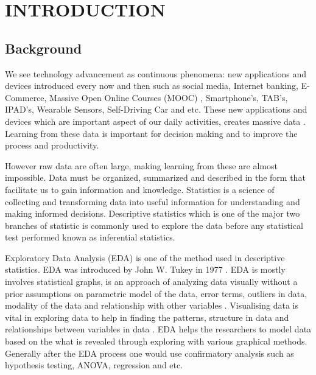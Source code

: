 \chapter{\textbf{INTRODUCTION}}\label{Introchap} 

\section{Background}

We see technology advancement as continuous phenomena: new applications and devices introduced every now and then such as social media, Internet banking, E-Commerce, Massive Open Online Courses (MOOC) , Smartphone's, TAB's, IPAD's, Wearable Sensors, Self-Driving Car and etc. These new applications and devices which are important aspect of our daily activities, creates massive data \cite[]{torrecilla2018data}. Learning from these data is important for decision making and to improve the process and productivity. 

However raw data are often large, making learning from these are almost impossible. Data must be organized, summarized and described in the form that facilitate us to gain information and knowledge. Statistics is a science of collecting and transforming data into useful information for understanding and making informed decisions. Descriptive statistics which is one of the major two branches of statistic is commonly used to explore the data before any statistical test performed known as inferential statistics. 

Exploratory Data Analysis (EDA) is one of the method used in descriptive statistics. EDA was introduced by John W. Tukey in 1977 \cite[]{wendy2002computational}. EDA is mostly involves statistical graphs, is an approach of analyzing data visually without a prior assumptions on parametric model of the data, error terms, outliers in data, modality of the data and relationship with other variables \cite[]{velleman1981applications,wendy2002computational}. Visualising data is vital in exploring data \cite[]{scott2005multidimensional} to help in finding the  patterns, structure in data and relationships between variables in data \cite[]{hand2001principles}. EDA helps the researchers to model data based on the what is revealed through exploring with various graphical methods. Generally after the EDA process one would use confirmatory analysis such as hypothesis testing, ANOVA, regression and etc.

